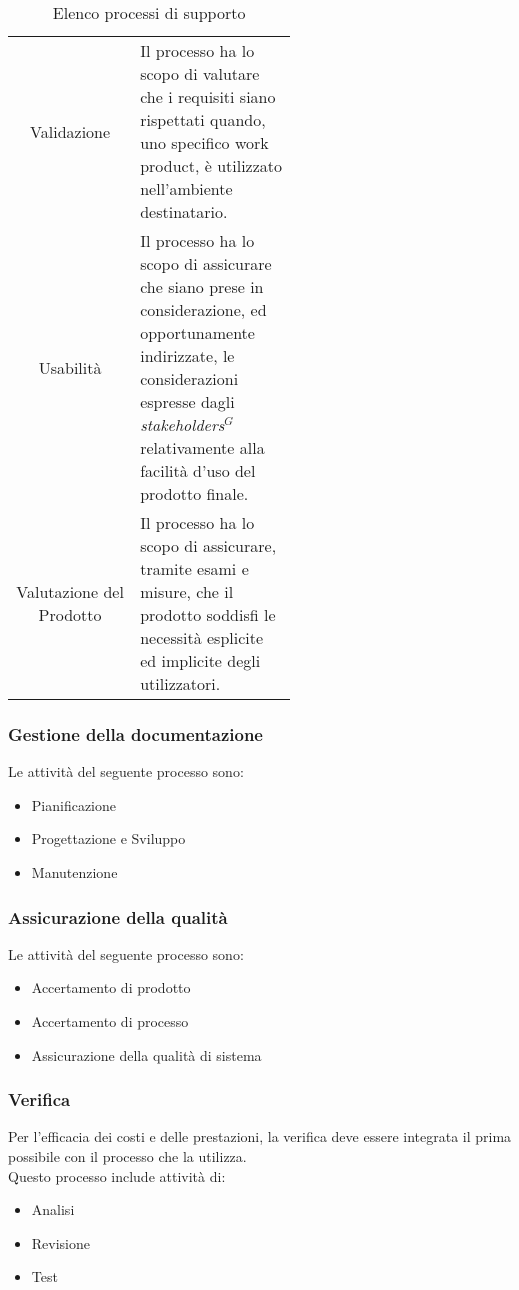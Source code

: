 \begin{table}[h!]
\begin{tabular}{c|p{0.56\linewidth}}
        \rowcolor[RGB]{233, 245, 206}
        Validazione
        & Il processo ha lo scopo di valutare che i requisiti siano rispettati quando,
        uno specifico work product, è utilizzato nell'ambiente destinatario. \\[4pt]
        \rowcolor[RGB]{216, 235, 171}
        Usabilità
        & Il processo ha lo scopo di assicurare che siano prese in considerazione, ed  opportunamente indirizzate,
        le considerazioni espresse dagli \textit{stakeholders}$^G$ relativamente alla facilità d'uso del prodotto finale. \\[4pt]
        \rowcolor[RGB]{233, 245, 206}
        Valutazione del Prodotto
        & Il processo ha lo scopo di assicurare, tramite esami e misure, che il prodotto soddisfi le necessità esplicite
        ed implicite degli utilizzatori.  \\[4pt]
    \end{tabular}
    \caption{Elenco processi di supporto}
\end{table}

\subsubsection{Gestione della documentazione}
Le attività del seguente processo sono:
\begin{itemize}
    \item Pianificazione
    \item Progettazione e Sviluppo
    \item Manutenzione
\end{itemize}

\subsubsection{Assicurazione della qualità}
Le attività del seguente processo sono:
\begin{itemize}
    \item Accertamento di prodotto
    \item Accertamento di processo
    \item Assicurazione della qualità di sistema
\end{itemize}

\subsubsection{Verifica}
Per l'efficacia dei costi e delle prestazioni, la verifica deve essere integrata il prima possibile con il processo
che la utilizza.\\
Questo processo include attività di:
\begin{itemize}
    \item Analisi
    \item Revisione
    \item Test
\end{itemize}

\setlength\extrarowheight{0pt}
